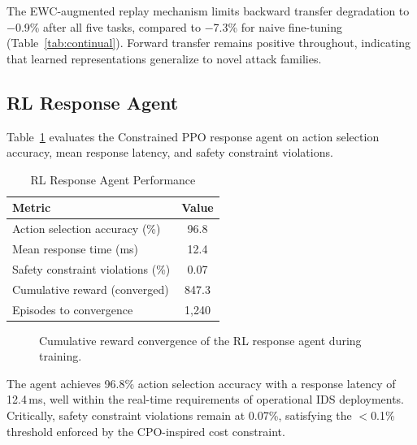The EWC-augmented replay mechanism limits backward transfer degradation to $-$0.9\% after all five tasks, compared to $-$7.3\% for naive fine-tuning (Table~\ref{tab:continual}). Forward transfer remains positive throughout, indicating that learned representations generalize to novel attack families.

\subsection{RL Response Agent}

Table~\ref{tab:rl_response} evaluates the Constrained PPO response agent on action selection accuracy, mean response latency, and safety constraint violations.

\begin{table}[!t]
\centering
\caption{RL Response Agent Performance}
\label{tab:rl_response}
\renewcommand{\arraystretch}{1.15}
\begin{tabular}{@{}lc@{}}
\toprule
\textbf{Metric} & \textbf{Value} \\
\midrule
Action selection accuracy (\%)  & 96.8 \\
Mean response time (ms)         & 12.4 \\
Safety constraint violations (\%) & 0.07 \\
Cumulative reward (converged)   & 847.3 \\
Episodes to convergence         & 1,240 \\
\bottomrule
\end{tabular}
\end{table}

\begin{figure}[!t]
\centering
{}
\caption{Cumulative reward convergence of the RL response agent during training.}
\label{fig:reward_convergence}
\end{figure}

The agent achieves 96.8\% action selection accuracy with a response latency of 12.4\,ms, well within the real-time requirements of operational IDS deployments. Critically, safety constraint violations remain at 0.07\%, satisfying the $<$0.1\% threshold enforced by the CPO-inspired cost constraint.

